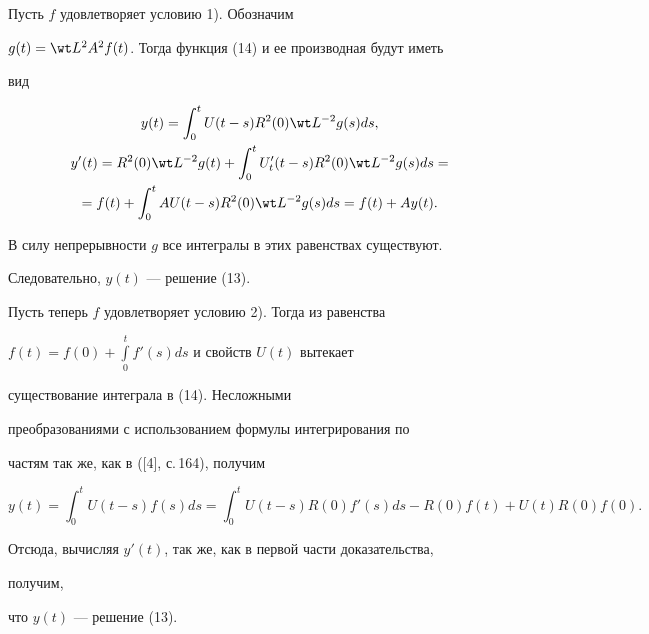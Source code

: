 \begin{pf} 


Пусть $f$ удовлетворяет условию 1). Обозначим 


$g(t)=\wt L{}^2A^2f(t)$. Тогда функция (14) и ее производная будут иметь 


вид 


\begin{gather*} 


y(t)=\int^t_0 U(t-s)R^2(0)\wt L{}^{-2}g(s)ds, \\ 


% 


y'(t)=R^2(0)\wt L{}^{-2}g(t)+\int^t_0 


U'_t(t-s)R^2(0)\wt L{}^{-2}g(s)ds= \\ 


=f(t)+\int^t_0 AU(t-s)R^2(0)\wt L{}^{-2}g(s)ds=f(t)+Ay(t). 


\end{gather*} 


В силу непрерывности $g$ все интегралы в этих равенствах существуют. 


Следовательно, $y(t)$ --- решение (13). 


 


Пусть теперь $f$ удовлетворяет условию 2). Тогда из равенства 


$f(t)=f(0)+\int\limits^t_0 f'(s)ds$ и свойств $U(t)$ вытекает 


существование интеграла в (14). Несложными 


преобразованиями с использованием формулы интегрирования по 


частям так же, как в ([4], с.\,164), получим 


$$ 


y(t)=\int^t_0 U(t-s)f(s)ds=\int^t_0 U(t-s)R(0) 


f'(s)ds-R(0)f(t)+U(t)R(0)f(0). 


$$ 


Отсюда, вычисляя $y'(t)$, так же, как в первой части доказательства, 


получим, 


что $y(t)$ --- решение (13). 


\end{pf} 


 


 


 



